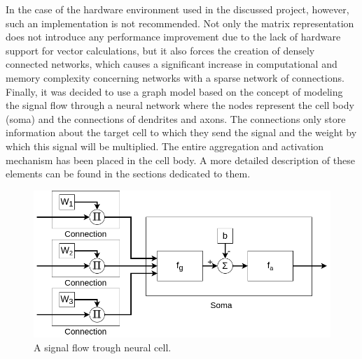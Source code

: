 In the case of the hardware environment used in the discussed project, however, such an 
implementation is not recommended. 
Not only the matrix representation does not introduce any performance improvement due to the 
lack of hardware support for vector calculations, but it also forces the creation of densely 
connected networks, which causes a significant increase in computational and memory complexity 
concerning networks with a sparse network of connections.
Finally, it was decided to use a graph model based on the concept of modeling the signal flow 
through a neural network where the nodes represent the cell body (soma) and the connections of 
dendrites and axons. 
The connections only store information about the target cell to which they send the signal and 
the weight by which this signal will be multiplied. 
The entire aggregation and activation mechanism has been placed in the cell body. 
A more detailed description of these elements can be found in the sections dedicated to them.
\begin{figure}[htb] 
	\centering
	\includegraphics[width=\textwidth]{figures/signal_model}
	\caption{A signal flow trough neural cell.}
	\label{fig:signal_model}
\end{figure}

